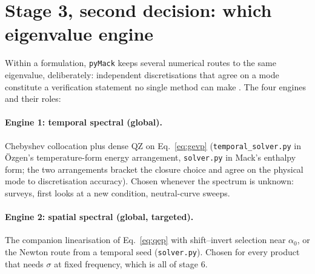 \documentclass[11pt]{article}
\begin{document}
\section{Stage 3, second decision: which eigenvalue engine}\label{sec:engines}
Within a formulation, \texttt{pyMack} keeps several numerical routes to the same eigenvalue,
deliberately: independent discretisations that agree on a mode constitute a verification
statement no single method can make \cite{malik1990}. The four engines and their roles:

\paragraph{Engine 1: temporal spectral (global).} Chebyshev collocation
\cite{orszag1971,trefethen2000} plus dense QZ on Eq.~\eqref{eq:gevp}
(\texttt{temporal\_solver.py} in \"Ozgen's temperature-form energy arrangement,
\texttt{solver.py} in Mack's enthalpy form; the two arrangements bracket the closure choice and
agree on the physical mode to discretisation accuracy). Chosen whenever the spectrum is unknown:
surveys, first looks at a new condition, neutral-curve sweeps.

\paragraph{Engine 2: spatial spectral (global, targeted).} The companion linearisation of
Eq.~\eqref{eq:qep} with shift--invert selection near $\alpha_0$, or the Newton route from a
temporal seed (\texttt{solver.py}). Chosen for every product that needs $\sigma$ at fixed
frequency, which is all of stage 6.
\end{document}

